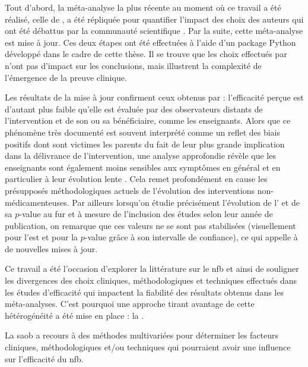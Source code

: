 Tout d'abord, la méta-analyse la plus récente au moment où ce travail a été réalisé, celle de \citet{Cortese2016}, a été répliquée 
pour quantifier l'impact des choix des auteurs qui ont été débattus par la communauté scientifique \citep{Micoulaud2016}. Par la suite, cette méta-analyse est 
mise à jour. Ces deux étapes ont été effectuées à l'aide d'un package Python développé 
dans le cadre de cette thèse. Il se trouve que les choix effectués par \citet{Cortese2016} n'ont pas d'impact sur les conclusions, 
mais illustrent la complexité de l'émergence de la preuve clinique.

Les résultats de la mise à jour confirment ceux obtenus par \citet{Cortese2016} : 
l'efficacité perçue est d'autant plus faible qu'elle est évaluée par 
des observateurs distants de l'intervention et de son ou sa bénéficiaire, comme les enseignants. Alors que ce phénomène très documenté est souvent 
interprété comme un reflet des biais positifs dont sont victimes les parents du fait de leur plus grande implication dans la délivrance de 
l'intervention, une analyse approfondie révèle que les enseignants sont également moins sensibles aux symptômes en général et en particulier 
à leur évolution lente \citep{Sollie2013, Narad2015}. 
Cela remet profondément en cause les présupposés méthodologiques actuels de l'évolution des interventions non-médicamenteuses. Par ailleurs
lorsqu'on étudie précisément l'évolution de l' et de sa $p$-value au fur et à mesure de l'inclusion des études selon leur année de publication, 
on remarque que ces valeurs ne se sont pas stabilisées (visuellement pour l'\gls{est} et pour la $p$-value grâce à son intervalle de confiance), 
ce qui appelle à de nouvelles mises à jour.

Ce travail a été l'occasion d'explorer 
la littérature sur le \gls{nfb} et ainsi de souligner les divergences des choix cliniques, méthodologiques et techniques effectués dans les études 
d'efficacité qui impactent la fiabilité
des résultats obtenus dans les méta-analyses. C'est pourquoi une approche tirant avantage de cette hétérogénéité a été mise en place : la .

La \gls{saob} a recours à des méthodes multivariées pour déterminer les facteurs cliniques, méthodologiques et/ou techniques qui pourraient avoir une 
influence sur l'efficacité du \gls{nfb}. 

